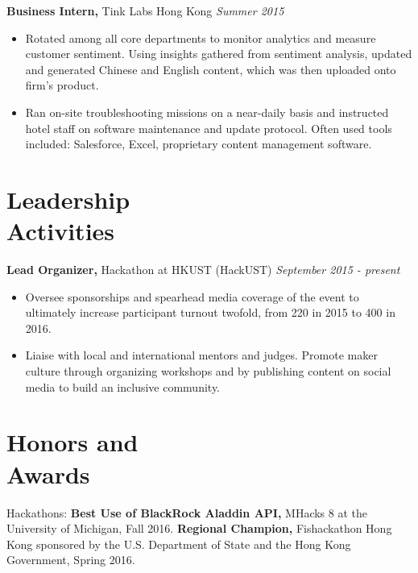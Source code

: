 \documentclass[resmargin]{res}
\begin{document}
\begin{resume}
%
{\bf Business Intern,} Tink Labs Hong Kong \hfill  \textit{Summer 2015}
\begin{itemize} \itemsep -2pt %
\item Rotated among all core departments to monitor analytics and measure customer sentiment. Using insights gathered from sentiment analysis, updated and generated Chinese and English content, which was then uploaded onto firm's product.
\item Ran on-site troubleshooting missions on a near-daily basis and instructed hotel staff on software maintenance and update protocol. Often used tools included: Salesforce, Excel, proprietary content management software.
\end{itemize} %

%
\section{Leadership \\ Activities} 
    {\bf Lead Organizer,} Hackathon at HKUST (HackUST) \hfill \textit{September 2015 - present}
        \begin{itemize} \itemsep -2pt
        \item Oversee sponsorships and spearhead media coverage of the event to ultimately increase participant turnout twofold, from 220 in 2015 to 400 in 2016. 
        \item Liaise with local and international mentors and judges. Promote maker culture through organizing workshops and by publishing content on social media to build an inclusive community.
		 \end{itemize}


\section{Honors and \\ Awards} 
Hackathons: {\bf Best Use of BlackRock Aladdin API,} MHacks 8 at the University of Michigan, Fall 2016. {\bf Regional Champion,} Fishackathon Hong Kong sponsored by the U.S. Department of State and the Hong Kong Government, Spring 2016. %



\end{resume}
\end{document}
